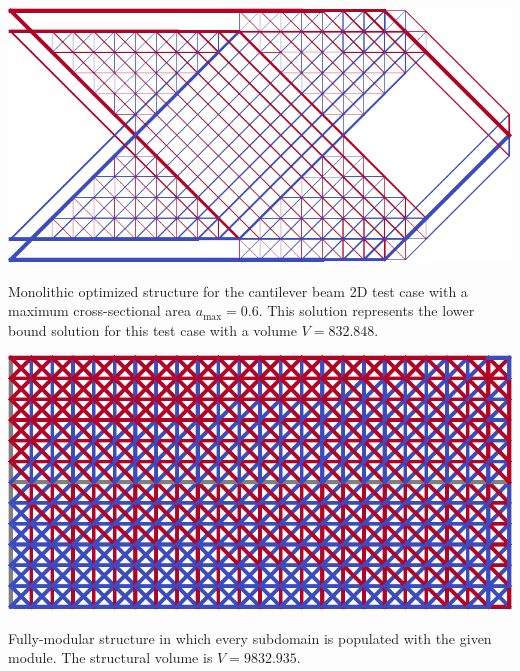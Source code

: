 \begin{marginfigure}
    \centering
    \includegraphics[width=\linewidth]{figures/06_DMO/00_cantilever_extremes/mono.pdf}
    \caption{Monolithic optimized structure for the cantilever beam 2D test case with a maximum cross-sectional area $a_\text{max}=0.6$. This solution represents the lower bound solution for this test case with a volume $V=832.848$.}
    \label{fig:06_cant_mono}
\end{marginfigure}


\begin{marginfigure}
    \centering
    \includegraphics[width=\linewidth]{figures/06_DMO/00_cantilever_extremes/cell.pdf}
    \caption{Fully-modular structure in which every subdomain is populated with the given module. The structural volume is $V=9832.935$.}
    \label{fig:06_cant_BC_cell}
\end{marginfigure}

